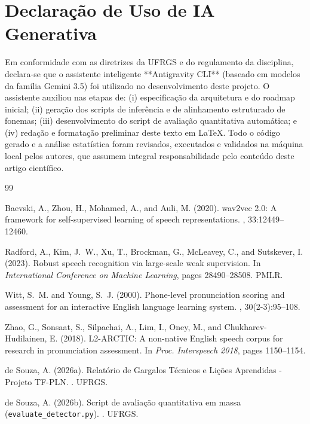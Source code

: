 \documentclass[12pt]{article}
\begin{document}
\section*{Declaração de Uso de IA Generativa}
Em conformidade com as diretrizes da UFRGS e do regulamento da disciplina, declara-se que o assistente inteligente **Antigravity CLI** (baseado em modelos da família Gemini 3.5) foi utilizado no desenvolvimento deste projeto. O assistente auxiliou nas etapas de: (i) especificação da arquitetura e do roadmap inicial; (ii) geração dos scripts de inferência e de alinhamento estruturado de fonemas; (iii) desenvolvimento do script de avaliação quantitativa automática; e (iv) redação e formatação preliminar deste texto em LaTeX. Todo o código gerado e a análise estatística foram revisados, executados e validados na máquina local pelos autores, que assumem integral responsabilidade pelo conteúdo deste artigo científico.


\begin{thebibliography}{99}

Baevski, A., Zhou, H., Mohamed, A., and Auli, M. (2020).
\newblock wav2vec 2.0: A framework for self-supervised learning of speech representations.
, 33:12449--12460.

Radford, A., Kim, J.~W., Xu, T., Brockman, G., McLeavey, C., and Sutskever, I. (2023).
\newblock Robust speech recognition via large-scale weak supervision.
\newblock In {\em International Conference on Machine Learning}, pages 28490--28508. PMLR.

Witt, S.~M. and Young, S.~J. (2000).
\newblock Phone-level pronunciation scoring and assessment for an interactive English language learning system.
, 30(2-3):95--108.

Zhao, G., Sonsaat, S., Silpachai, A., Lim, I., Oney, M., and Chukharev-Hudilainen, E. (2018).
\newblock L2-ARCTIC: A non-native English speech corpus for research in pronunciation assessment.
\newblock In {\em Proc. Interspeech 2018}, pages 1150--1154.

de Souza, A. (2026a).
\newblock Relatório de Gargalos Técnicos e Lições Aprendidas - Projeto TF-PLN.
. UFRGS.

de Souza, A. (2026b).
\newblock Script de avaliação quantitativa em massa (\texttt{evaluate\_detector.py}).
. UFRGS.

\end{thebibliography}
\end{document}

